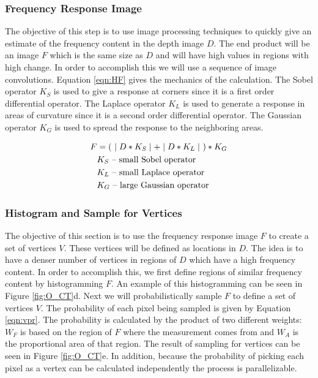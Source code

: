 \documentclass[12pt]{article}
\begin{document}
\subsubsection{Frequency Response Image}

The objective of this step is to use image processing techniques to
quickly give an estimate of the frequency content in the depth image
$D$. The end product will be an image $F$ which is the same size as $D$
and will have high values in regions with high change. In order to accomplish
this we will use a sequence of image convolutions. Equation \ref{eqn:HF}
gives the mechanics of the calculation. The Sobel operator $K_S$ is
used to give a response at corners since it is a first order
differential operator. The Laplace operator $K_L$ is used to generate a
response in areas of curvature since it is a second order differential
operator. The Gaussian operator $K_G$ is used to spread the response to the
neighboring areas.   

\begin{align}
F&=(\ \mid D \ast K_S \mid + \mid D \ast K_L \mid \ ) \ast K_G \label{eqn:HF} \\
 & K_S\text{ -- small Sobel operator}  \notag  \\
 & K_L\text{ -- small Laplace operator} \notag \\ 
 & K_G\text{ -- large Gaussian operator} \notag
\end{align}

\subsubsection{Histogram and Sample for Vertices}

The objective of this section is to use the frequency response image $F$
to create a set of vertices $V$. These vertices will be defined as
locations in $D$. The idea is to have a denser number of vertices in
regions of $D$ which have a high frequency content. In order to
accomplish this, we first define regions of similar frequency content by histogramming $F$. An
example of this histogramming can be seen in Figure \ref{fig:O_CT}d.
Next we will probabilistically sample $F$ to define a
set of vertices $V$. The probability of each pixel being sampled is 
given by Equation \ref{eqn:vpr}. The probability is calculated by the
product of two different weights: $W_F$ is based on the region of $F$
where the measurement comes from and $W_A$ is the proportional area of
that region. The result of sampling for vertices can be seen in Figure
\ref{fig:O_CT}e. In addition, because the probability of picking each
pixel as a vertex can be calculated independently the process is
parallelizable.   
\end{document}
